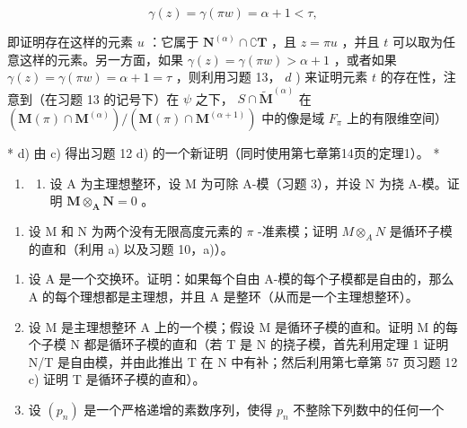 \[
\gamma (z) = \gamma (\pi w) = \alpha + 1 <   \tau ,
\]

即证明存在这样的元素 \(u\) ：它属于 \(\mathbf{N}^{(\alpha)} \cap \complement \mathbf{T}\) ，且 \(z = \pi u\) ，并且 \(t\) 可以取为任意这样的元素。另一方面，如果 \(\gamma(z) = \gamma(\pi w) > \alpha + 1\) ，或者如果 \(\gamma(z) = \gamma(\pi w) = \alpha + 1 = \tau\) ，则利用习题 13， \(d\) ) 来证明元素 \(t\) 的存在性，注意到（在习题 13 的记号下）在 \(\psi\) 之下， \(S \cap \tilde{\mathbf{M}}^{(\alpha)}\) 在 \((\mathbf{M}(\pi) \cap \mathbf{M}^{(\alpha)}) / (\mathbf{M}(\pi) \cap \mathbf{M}^{(\alpha + 1)})\) 中的像是域 \(F_{\pi}\) 上的有限维空间）

* d) 由 c) 得出习题 12 d) 的一个新证明（同时使用第七章第14页的定理1）。 *

\begin{enumerate}
\def\labelenumi{\arabic{enumi})}
\setcounter{enumi}{14}
\tightlist
\item
  \begin{enumerate}
  \def\labelenumii{\alph{enumii})}
  \tightlist
  \item
    设 A 为主理想整环，设 M 为可除 A-模（习题 3），并设 N 为挠 A-模。证明 \(\mathbf{M} \otimes_{\mathbf{A}} \mathbf{N} = 0\) 。
  \end{enumerate}
\end{enumerate}

\begin{enumerate}
\def\labelenumi{\alph{enumi})}
\setcounter{enumi}{1}
\tightlist
\item
  设 M 和 N 为两个没有无限高度元素的 \(\pi\) -准素模；证明 \(M \otimes_{A} N\) 是循环子模的直和（利用 a) 以及习题 10，a)）。
\end{enumerate}

\BourbakiExerciseGroup

\begin{enumerate}
\def\labelenumi{\arabic{enumi})}
\item
  设 A 是一个交换环。证明：如果每个自由 A-模的每个子模都是自由的，那么 A 的每个理想都是主理想，并且 A 是整环（从而是一个主理想整环）。
\item
  设 M 是主理想整环 A 上的一个模；假设 M 是循环子模的直和。证明 M 的每个子模 N 都是循环子模的直和（若 T 是 N 的挠子模，首先利用定理 1 证明 N/T 是自由模，并由此推出 T 在 N 中有补；然后利用第七章第 57 页习题 12 c) 证明 T 是循环子模的直和）。
\item
  设 \((p_n)\) 是一个严格递增的素数序列，使得 \(p_n\) 不整除下列数中的任何一个
\end{enumerate}

